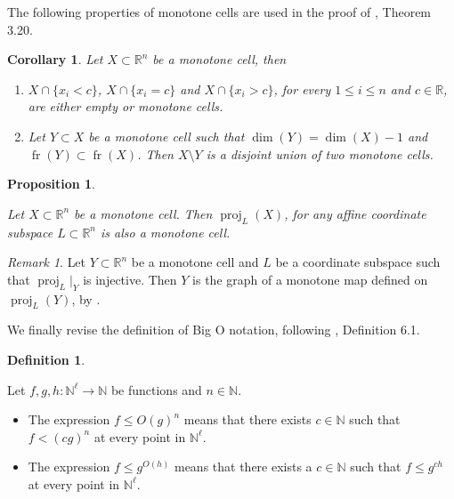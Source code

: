 \documentclass[
]{book}
\providecommand{\tightlist}{%
  \setlength{\itemsep}{0pt}\setlength{\parskip}{0pt}}
\newtheorem{corollary}{Corollary}[chapter]
\newtheorem{proposition}{Proposition}[chapter]
\theoremstyle{definition}
\newtheorem{definition}{Definition}[chapter]
\theoremstyle{definition}
\theoremstyle{definition}
\theoremstyle{definition}
\theoremstyle{remark}
\newtheorem*{remark}{Remark}
\begin{document}
The following properties of monotone cells are used in the proof of \citet{bgv15}, Theorem 3.20.

\begin{corollary}

\citep[Corollary 7, Theorem 11]{bgv13}
Let \(X \subset \mathbb{R}^n\) be a monotone cell, then

\begin{enumerate}
\def\labelenumi{\arabic{enumi}.}
\tightlist
\item
  \(X \cap \{ x_i < c \}\), \(X \cap \{ x_i = c \}\) and \(X \cap \{ x_i > c \}\), for every \(1 \le i \le n\) and \(c \in \mathbb{R}\), are either empty or monotone cells.
\item
  Let \(Y \subset X\) be a monotone cell such that \(\dim(Y) = \dim(X) - 1\) and \({\operatorname{fr} \left( Y \right)} \subset {\operatorname{fr} \left( X \right)}\). Then \(X \setminus Y\) is a disjoint union of two monotone cells.
\end{enumerate}

\end{corollary}

\begin{proposition}
\citep[Theorem 10]{bgv13}

Let \(X \subset \mathbb{R}^n\) be a monotone cell. Then \(\operatorname{proj}_{L}(X)\), for any affine coordinate subspace \(L \subset \mathbb{R}^n\) is also a monotone cell.
\end{proposition}

\begin{remark}
\citep[Remark 2.11]{bgv15}
Let \(Y \subset \mathbb{R}^n\) be a monotone cell and \(L\) be a coordinate subspace such that \(\operatorname{proj}_L\vert_Y\) is injective.
Then \(Y\) is the graph of a monotone map defined on \(\operatorname{proj}_L(Y)\), by \citep[Theorem 7 and Corollary 5]{bgv13}.
\end{remark}

We finally revise the definition of Big O notation, following \citet{gv2009}, Definition 6.1.

\begin{definition}
\protect\hypertarget{def:big-o}{}\label{def:big-o}

\citep[Definition 6.1]{gv2009}
Let \(f,g,h : \mathbb{N}^\ell \to \mathbb{N}\) be functions and \(n \in \mathbb{N}\).

\begin{itemize}
\tightlist
\item
  The expression \(f \le O(g)^n\) means that there exists \(c \in \mathbb{N}\) such that \(f < (cg)^n\) at every point in \(\mathbb{N}^\ell\).
\item
  The expression \(f \le g^{O(h)}\) means that there exists a \(c \in \mathbb{N}\) such that \(f \le g^{ch}\) at every point in \(\mathbb{N}^\ell\).
\end{itemize}

\end{definition}
\end{document}
